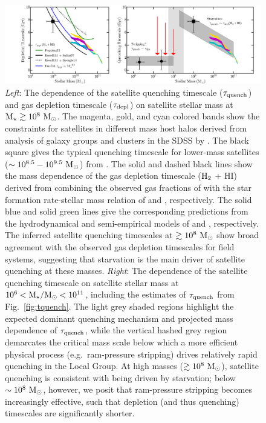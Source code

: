 \begin{figure}
 \centering
 \hspace*{-0.48in}
   \includegraphics[width=6.5in]{tcbflash/f6.png}
   \caption[Physical Model of TCBFlash]{\emph{Left}: The dependence of the satellite quenching
     timescale ($\tau_{\rm quench}$) and gas depletion timescale
     ($\tau_{\rm depl}$) on satellite stellar mass at ${\rm M}_{\star} \gtrsim
     10^{8}~{\rm M}_{\odot}$. The magenta, gold, and cyan colored bands show the
     constraints for satellites in different mass host halos derived
     from analysis of galaxy groups and clusters in the SDSS by
     \citet{wetzel13}. The black square gives the typical quenching
     timescale for lower-mass satellites ($\sim
     10^{8.5}-10^{9.5}~{\rm M}_{\odot}$) from \citet{wheeler14}. The solid and
     dashed black lines show the mass dependence of the gas depletion
     timescale (${\rm H}_{2}$ + H{\scriptsize I}) derived from
     combining the observed gas fractions of \citet{boselli14} with
     the star formation rate-stellar mass relation of \citet{salim07}
     and \citet{speagle14}, respectively. The solid blue and solid
     green lines give the corresponding predictions from the
     hydrodynamical and semi-empirical models of \citet{dave11a} and
     \citet{popping15}, respectively. The inferred satellite quenching
     timescales at $\gtrsim10^{8}~{\rm M}_{\odot}$ show broad agreement with the
     observed gas depletion timescales for field systems, suggesting
     that starvation is the main driver of satellite quenching at
     these masses. \emph{Right}: The dependence of the satellite
     quenching timescale on satellite stellar mass at $10^{6} <
     {\rm M}_{\star}/{\rm M}_{\odot} < 10^{11}$, including the estimates of $\tau_{\rm
       quench}$ from Fig.~\ref{fig:tquench}. The light grey shaded
     regions highlight the expected dominant quenching mechanism and
     projected mass dependence of $\tau_{\rm quench}$, while the
     vertical hashed grey region demarcates the critical mass scale
     below which a more efficient physical process (e.g.~ram-pressure
     stripping) drives relatively rapid quenching in the Local
     Group. At high masses ($\gtrsim10^{8}~{\rm M}_{\odot}$), satellite
     quenching is consistent with being driven by starvation; below
     $\sim10^{8}~{\rm M}_{\odot}$, however, we posit that ram-pressure stripping
     becomes increasingly effective, such that depletion (and thus
     quenching) timescales are significantly shorter.}

 \label{fig:cartoon}
\end{figure}


